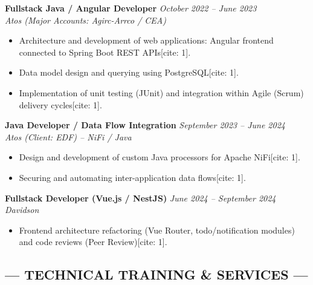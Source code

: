 \documentclass[a4paper,10pt]{article}
\newcommand{\cvtext}{\fontsize{9}{11}\selectfont}
\begin{document}
\begin{minipage}[t]{0.68\textwidth}
\begin{tcolorbox}[cvbox, width=\linewidth, fontupper=\cvtext]
    \textcolor{bleu}{\textbf{Fullstack Java / Angular Developer}} \hfill \textit{October 2022 -- June 2023}\\
    \textit{Atos (Major Accounts: Agirc-Arrco / CEA)}
    \begin{itemize}[leftmargin=*]
      \item Architecture and development of web applications: Angular frontend connected to Spring Boot REST APIs[cite: 1].
      \item Data model design and querying using PostgreSQL[cite: 1].
      \item Implementation of unit testing (JUnit) and integration within Agile (Scrum) delivery cycles[cite: 1].
    \end{itemize}
    \vspace{0.8em}

    \textcolor{bleu}{\textbf{Java Developer / Data Flow Integration}} \hfill \textit{September 2023 -- June 2024}\\
    \textit{Atos (Client: EDF) -- NiFi / Java}
    \begin{itemize}[leftmargin=*]
      \item Design and development of custom Java processors for Apache NiFi[cite: 1].
      \item Securing and automating inter-application data flows[cite: 1].
    \end{itemize}
    \vspace{0.8em}

    \textcolor{bleu}{\textbf{Fullstack Developer (Vue.js / NestJS)}} \hfill \textit{June 2024 -- September 2024}\\
    \textit{Davidson}
    \begin{itemize}[leftmargin=*]
      \item Frontend architecture refactoring (Vue Router, todo/notification modules) and code reviews (Peer Review)[cite: 1].
    \end{itemize}

    \vspace{0.4em}
    \subsection*{--- TECHNICAL TRAINING \& SERVICES ---}
    \vspace{0.3em}


\end{tcolorbox}
\end{minipage}
\end{document}
